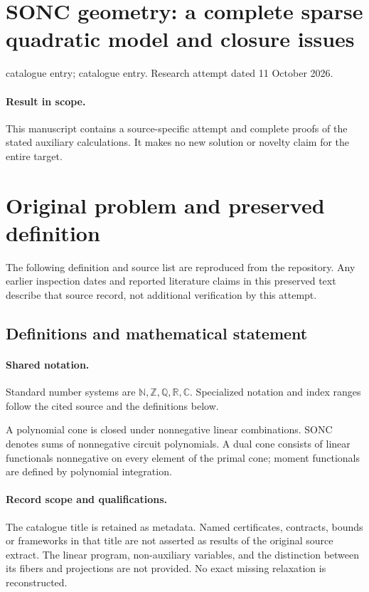 \documentclass[11pt]{article}
\begin{document}
\section*{SONC geometry: a complete sparse quadratic model and closure issues}
\noindent catalogue entry; catalogue entry. Research attempt dated 11 October 2026.
\paragraph{Result in scope.}This manuscript contains a source-specific attempt and complete proofs of the stated auxiliary calculations. It makes no new solution or novelty claim for the entire target.
\section{Original problem and preserved definition}
The following definition and source list are reproduced from the repository. Any earlier inspection dates and reported literature claims in this preserved text describe that source record, not additional verification by this attempt.
\subsection{Definitions and mathematical statement}

\paragraph{Shared notation.}Standard number systems are $\mathbb N,\mathbb Z,\mathbb Q,\mathbb R,\mathbb C$. Specialized notation and index ranges follow the cited source and the definitions below.


A polynomial cone is closed under nonnegative linear combinations. SONC denotes sums of nonnegative circuit polynomials. A dual cone consists of linear functionals nonnegative on every element of the primal cone; moment functionals are defined by polynomial integration.
\paragraph{Record scope and qualifications.}
The catalogue title is retained as metadata. Named certificates, contracts, bounds or frameworks in that title are not asserted as results of the original source extract.
The linear program, non-auxiliary variables, and the distinction between its fibers and projections are not provided. No exact missing relaxation is reconstructed.
\end{document}
